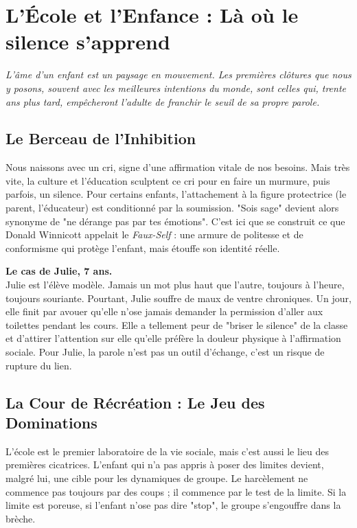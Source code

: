 \chapter{L'École et l'Enfance : Là où le silence s'apprend}

\textit{L'âme d'un enfant est un paysage en mouvement. Les premières clôtures que nous y posons, souvent avec les meilleures intentions du monde, sont celles qui, trente ans plus tard, empêcheront l'adulte de franchir le seuil de sa propre parole.}

\section{Le Berceau de l'Inhibition}
Nous naissons avec un cri, signe d'une affirmation vitale de nos besoins. Mais très vite, la culture et l'éducation sculptent ce cri pour en faire un murmure, puis parfois, un silence. Pour certains enfants, l'attachement à la figure protectrice (le parent, l'éducateur) est conditionné par la soumission. "Sois sage" devient alors synonyme de "ne dérange pas par tes émotions". C'est ici que se construit ce que Donald Winnicott appelait le \textit{Faux-Self} : une armure de politesse et de conformisme qui protège l'enfant, mais étouffe son identité réelle.

\begin{NoteClinique}
\textbf{Le cas de Julie, 7 ans.} \\
Julie est l'élève modèle. Jamais un mot plus haut que l'autre, toujours à l'heure, toujours souriante. Pourtant, Julie souffre de maux de ventre chroniques. Un jour, elle finit par avouer qu'elle n'ose jamais demander la permission d'aller aux toilettes pendant les cours. Elle a tellement peur de "briser le silence" de la classe et d'attirer l'attention sur elle qu'elle préfère la douleur physique à l'affirmation sociale. Pour Julie, la parole n'est pas un outil d'échange, c'est un risque de rupture du lien.
\end{NoteClinique}

\section{La Cour de Récréation : Le Jeu des Dominations}
L'école est le premier laboratoire de la vie sociale, mais c'est aussi le lieu des premières cicatrices. L'enfant qui n'a pas appris à poser des limites devient, malgré lui, une cible pour les dynamiques de groupe. Le harcèlement ne commence pas toujours par des coups ; il commence par le test de la limite. Si la limite est poreuse, si l'enfant n'ose pas dire "stop", le groupe s'engouffre dans la brèche.

